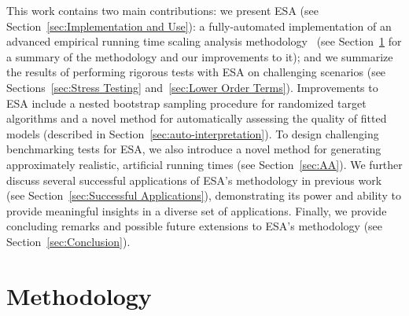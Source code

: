 \documentclass[aic]{iosart2x}
\begin{document}
This work contains two main contributions: we present ESA (see Section~\ref{sec:Implementation and Use}): a fully-automated implementation of an advanced empirical running time scaling analysis methodology~\cite{Hoo09} (see Section~\ref{sec:method} for a summary of the methodology and our improvements to it); and we summarize the results of performing rigorous tests with ESA on challenging scenarios (see Sections~\ref{sec:Stress Testing} and~\ref{sec:Lower Order Terms}). Improvements to ESA include a nested bootstrap sampling procedure for randomized target algorithms and a novel method for automatically assessing the quality of fitted models (described in Section~\ref{sec:auto-interpretation}). To design challenging benchmarking tests for ESA, we also introduce a novel method for generating approximately realistic, artificial running times (see Section~\ref{sec:AA}). We further discuss several successful applications of ESA's methodology in previous work (see Section~\ref{sec:Successful Applications}), demonstrating its power and ability to provide meaningful insights in a diverse set of applications. Finally, we provide concluding remarks and possible future extensions to ESA's methodology (see Section~\ref{sec:Conclusion}).


\section{Methodology}
\label{sec:method}
\end{document}
